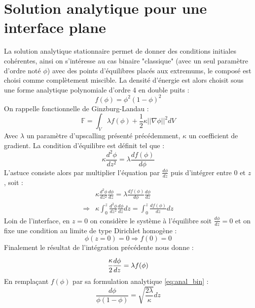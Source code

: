 
\chapter{Solution analytique pour une interface plane}
La solution analytique stationnaire permet de donner des conditions initiales cohérentes, ainsi on s'intéresse au cas binaire "classique" (avec un seul paramètre d'ordre noté $\phi$) avec des points d'équilibres placés aux extremums, le composé est choisi comme complètement miscible. La densité d'énergie est alors choisit sous une forme analytique polynomiale d'ordre 4 en double puits :
\begin{equation}
	f(\phi) = \phi^2 (1-\phi)^2
	\label{eq:anal_bin}
\end{equation}
On rappelle fonctionnelle de Ginzburg-Landau :
\begin{equation}
	\mathbb{F} =\int_V \lambda f(\phi) + \frac{1}{2}\kappa ||\nabla \phi||^2 dV
\end{equation}
Avec $\lambda$ un paramètre d'upscalling présenté précédemment, $\kappa$ un coefficient de gradient.
La condition d'équilibre est définit tel que :
\begin{equation}
	\kappa \frac{d^2\phi}{dz^2} = \lambda \frac{d f(\phi)}{d\phi}
\end{equation}
L'astuce consiste alors par multiplier l'équation par $\displaystyle \frac{d\phi}{dz}$ puis d'intégrer entre 0 et $z$, soit :
\begin{align}
	& \kappa \frac{d^2\phi}{dz^2}\frac{d\phi}{dz} = \lambda \frac{d f(\phi)}{d\phi}\frac{d\phi}{dz} \\
	\Rightarrow & \kappa \int_0^z \frac{d^2\phi}{dz^2}\frac{d\phi}{dz} dz= \int_0^z \frac{d f(\phi)}{dz} dz
\end{align}
Loin de l'interface, en $z=0$ on considère le système à l'équilibre soit $\frac{d\phi}{dz} = 0$ et on fixe une condition au limite de type Dirichlet homogène :
\begin{equation}
	\phi (z= 0) = 0 \Rightarrow f(0) = 0
\end{equation}
Finalement le résultat de l'intégration précédente nous donne :
\begin{equation}
		\cfrac{\kappa}{2} \frac{d\phi}{dz} = \lambda f(\phi)
\end{equation}
En remplaçant $f(\phi)$ par sa formulation analytique \ref{eq:anal_bin} : 
\begin{equation}
	\frac{d\phi}{\phi(1-\phi)} = \sqrt{\frac{2\lambda}{\kappa}} dz
	\label{solution_statio_plane}
\end{equation}
